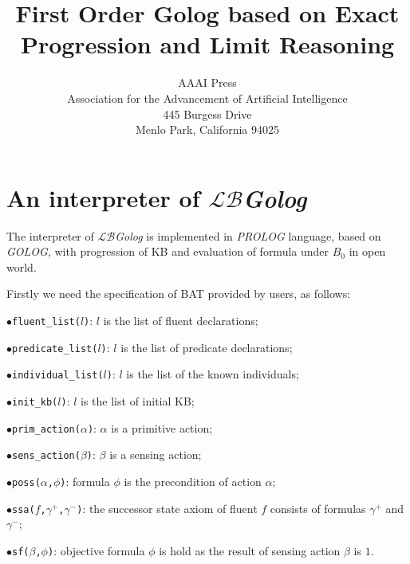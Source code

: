 \documentclass[letterpaper]{article}
\begin{document}
%
\title{First Order Golog based on Exact Progression and Limit Reasoning}
\author{AAAI Press\\
Association for the Advancement of Artificial Intelligence\\
445 Burgess Drive\\
Menlo Park, California 94025\\
}
\maketitle
\begin{abstract}
\begin{quote}

\end{quote}
\end{abstract}

\setcounter{secnumdepth}{1}
\section{An interpreter of \emph{$\mathcal{LB}$Golog}}

The interpreter of \emph{$\mathcal{LB}$Golog} is implemented in \emph{PROLOG} language, based on \emph{GOLOG}, with progression of KB and evaluation of formula under $B_0$ in open world.

Firstly we need the specification of BAT provided by users, as follows:

$\bullet$\texttt{fluent\_list($l$)}: $l$ is the list of fluent declarations;

$\bullet$\texttt{predicate\_list($l$)}: $l$ is the list of predicate declarations;

$\bullet$\texttt{individual\_list($l$)}: $l$ is the list of the known individuals;

$\bullet$\texttt{init\_kb($l$)}: $l$ is the list of initial KB;

$\bullet$\texttt{prim\_action($\alpha$)}: $\alpha$ is a primitive action;

$\bullet$\texttt{sens\_action($\beta$)}: $\beta$ is a sensing action;

$\bullet$\texttt{poss($\alpha$,$\phi$)}: formula $\phi$ is the precondition of action $\alpha$;

$\bullet$\texttt{ssa($f$,$\gamma^+$,$\gamma^-$)}: the successor state axiom of fluent $f$ consists of formulas $\gamma^+$ and $\gamma^-$;

$\bullet$\texttt{sf($\beta$,$\phi$)}: objective formula $\phi$ is hold as the result of sensing action $\beta$ is $1$.
\end{document}
